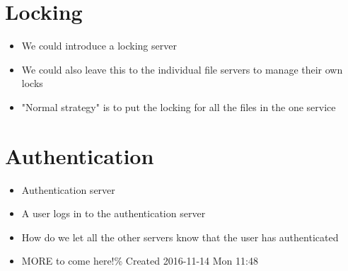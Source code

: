 \documentclass[11pt]{article}
\begin{document}
\section{Locking}
\label{sec-7}
\begin{itemize}
\item We could introduce a locking server
\item We could also leave this to the individual file servers to manage their own locks
\item "Normal strategy" is to put the locking for all the files in the one service
\end{itemize}

\section{Authentication}
\label{sec-8}
\begin{itemize}
\item Authentication server
\item A user logs in to the authentication server
\item How do we let all the other servers know that the user has authenticated
\item MORE to come here!\% Created 2016-11-14 Mon 11:48
\end{itemize}
\end{document}
